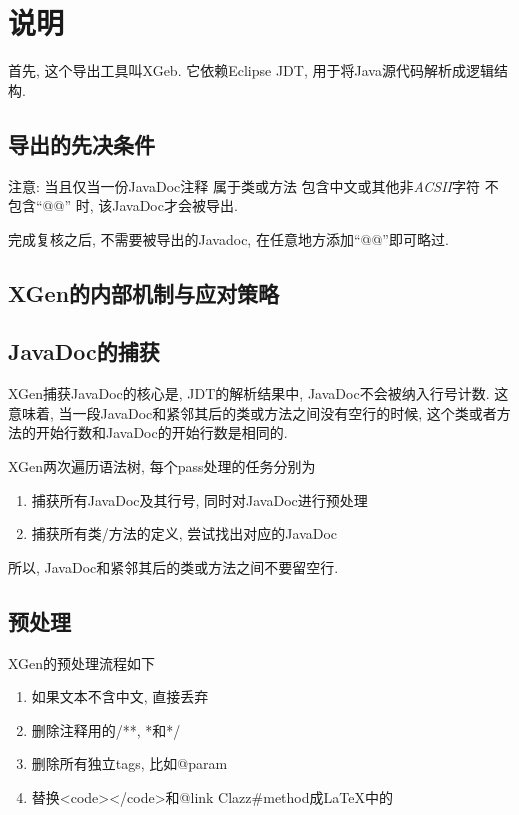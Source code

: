 \chapter{说明}

首先, 这个导出工具叫XGeb.
它依赖Eclipse JDT, 用于将Java源代码解析成逻辑结构.

\section{导出的先决条件}

注意: 当且仅当一份JavaDoc注释
属于类或方法
包含中文或其他非\emph{ACSII}字符
不包含``@@''
时, 该JavaDoc才会被导出.

完成复核之后, 不需要被导出的Javadoc, 在任意地方添加``@@''即可略过.

\section{XGen的内部机制与应对策略}

\section{JavaDoc的捕获}

XGen捕获JavaDoc的核心是, JDT的解析结果中, JavaDoc不会被纳入行号计数.
这意味着, 当一段JavaDoc和紧邻其后的类或方法之间没有空行的时候,
这个类或者方法的开始行数和JavaDoc的开始行数是相同的.

XGen两次遍历语法树, 每个pass处理的任务分别为
\begin{centering}
    \begin{enumerate}
        \item 捕获所有JavaDoc及其行号, 同时对JavaDoc进行预处理
        \item 捕获所有类/方法的定义, 尝试找出对应的JavaDoc
    \end{enumerate}
\end{centering}

所以, JavaDoc和紧邻其后的类或方法之间不要留空行.

\section{预处理}

XGen的预处理流程如下

\begin{centering}
    \begin{enumerate}
        \item 如果文本不含中文, 直接丢弃
        \item 删除注释用的/**, *和*/
        \item 删除所有独立tags, 比如@param
        \item 替换<code></code>和{@link Clazz{\#}method}成LaTeX中的\emph{}
    \end{enumerate}
\end{centering}

